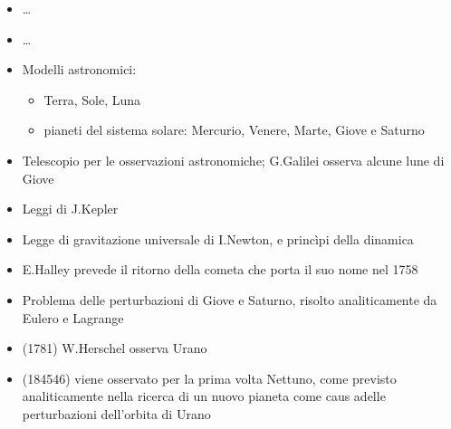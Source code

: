 \documentclass[letterpaper,10pt,italian]{jupyterBook}
\begin{document}
\sphinxAtStartPar
{}
\begin{itemize}
\item {} 
\sphinxAtStartPar
…

\end{itemize}

\sphinxAtStartPar
{}
\begin{itemize}
\item {} 
\sphinxAtStartPar
…

\item {} 
\sphinxAtStartPar
Modelli astronomici:
\begin{itemize}
\item {} 
\sphinxAtStartPar
Terra, Sole, Luna

\item {} 
\sphinxAtStartPar
pianeti del sistema solare: Mercurio, Venere, Marte, Giove e Saturno

\end{itemize}

\end{itemize}

\sphinxAtStartPar
{}
\begin{itemize}
\item {} 
\sphinxAtStartPar
Telescopio per le osservazioni astronomiche; G.Galilei osserva alcune lune di Giove

\item {} 
\sphinxAtStartPar
Leggi di J.Kepler

\item {} 
\sphinxAtStartPar
Legge di gravitazione universale di I.Newton, e princìpi della dinamica

\item {} 
\sphinxAtStartPar
E.Halley prevede il ritorno della cometa che porta il suo nome nel 1758

\item {} 
\sphinxAtStartPar
Problema delle perturbazioni di Giove e Saturno, risolto analiticamente da Eulero e Lagrange

\item {} 
\sphinxAtStartPar
(1781) W.Herschel osserva Urano

\item {} 
\sphinxAtStartPar
(1845\sphinxhyphen{}46) viene osservato per la prima volta Nettuno, come previsto analiticamente nella ricerca di un nuovo pianeta come caus adelle perturbazioni dell’orbita di Urano

\end{itemize}
\end{document}

